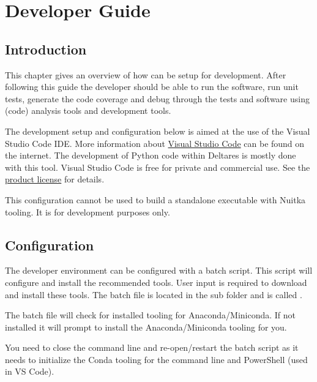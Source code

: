 \chapter{Developer Guide}\label{Chp:DevGuides}

\section{Introduction}

This chapter gives an overview of how \dfastmi can be setup for development.
After following this guide the developer should be able to run the software, run unit tests, generate the code coverage and debug through the tests and software using (code) analysis tools and development tools.

The development setup and configuration below is aimed at the use of the Visual Studio Code IDE.
More information about \href{https://code.visualstudio.com/}{Visual Studio Code} can be found on the internet.
The development of Python code within Deltares is mostly done with this tool.
Visual Studio Code is free for private and commercial use.
See the \href{https://code.visualstudio.com/license}{product license} for details.

\begin{Remark}
	\item This configuration cannot be used to build a standalone executable with Nuitka tooling.
	It is for development purposes only.
\end{Remark}

\section{Configuration}
The \dfastmi developer environment can be configured with a batch script.
This script will configure and install the recommended tools.
User input is required to download and install these tools.
The batch file is located in the sub folder  and is called .

The batch file will check for installed tooling for Anaconda/Miniconda.
If not installed it will prompt to install the Anaconda/Miniconda tooling for you. 

\begin{Note}
You need to close the command line and re-open/restart the batch script as it needs to initialize the Conda tooling for the command line and PowerShell (used in VS Code).
\end{Note}

